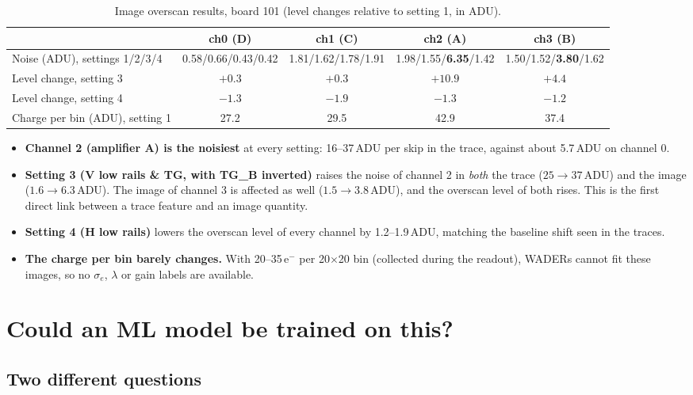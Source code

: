 \documentclass[10pt]{article}
\begin{document}
\begin{table}[H]
\centering
\small
\begin{tabular}{lcccc}
\toprule
 & ch0 (D) & ch1 (C) & ch2 (A) & ch3 (B) \\
\midrule
Noise (ADU), settings 1/2/3/4 & 0.58/0.66/0.43/0.42 & 1.81/1.62/1.78/1.91 & 1.98/1.55/\textbf{6.35}/1.42 & 1.50/1.52/\textbf{3.80}/1.62 \\
Level change, setting 3 & $+0.3$ & $+0.3$ & $\mathbf{+10.9}$ & $\mathbf{+4.4}$ \\
Level change, setting 4 & $-1.3$ & $-1.9$ & $-1.3$ & $-1.2$ \\
Charge per bin (ADU), setting 1 & 27.2 & 29.5 & 42.9 & 37.4 \\
\bottomrule
\end{tabular}
\caption{Image overscan results, board 101 (level changes relative to setting 1, in ADU).}
\label{tab:images}
\end{table}

\begin{itemize}
\item \textbf{Channel 2 (amplifier A) is the noisiest} at every setting: 16--37\,ADU per skip in the trace, against about
  5.7\,ADU on channel 0.
\item \textbf{Setting 3 (V low rails \& TG, with TG\_B inverted)} raises the noise of channel 2 in \emph{both} the trace
  ($25\to37$\,ADU) and the image ($1.6\to6.3$\,ADU). The image of channel 3 is affected as well ($1.5\to3.8$\,ADU), and the
  overscan level of both rises. This is the first direct link between a trace feature and an image quantity.
\item \textbf{Setting 4 (H low rails)} lowers the overscan level of every channel by 1.2--1.9\,ADU, matching the baseline
  shift seen in the traces.
\item \textbf{The charge per bin barely changes.} With 20--35\,e$^-$ per 20$\times$20 bin (collected during the readout), WADERs
  cannot fit these images, so no $\sigma_e$, $\lambda$ or gain labels are available.
\end{itemize}

\section{Could an ML model be trained on this?}
\label{sec:ml}

\subsection{Two different questions}
\end{document}
